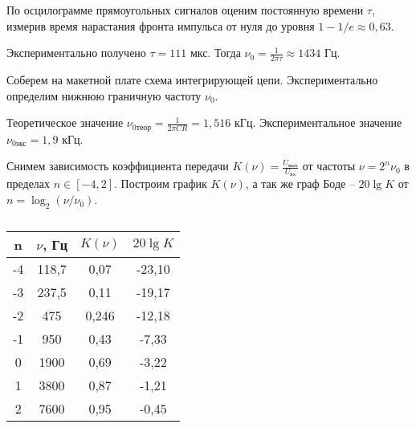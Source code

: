 	
	
	\noindent По осцилограмме прямоугольных сигналов оценим постоянную времени $\tau$,\\ измерив время нарастания фронта импульса от нуля до уровня $1 - 1/e \approx 0,63$.
	
	\noindent Экспериментально получено $\tau = 111$ мкс. Тогда $\nu_0 = \frac{1}{2 \pi \tau} \approx 1434$ Гц.
	
	
	
	\noindent Соберем на макетной плате схема интегрирующей цепи. Экспериментально определим нижнюю граничную частоту $\nu_0$.
	
	\noindent Теоретическое значение $\nu_{\text{0теор}} = \frac{1}{2 \pi C R} = 1,516$ кГц. Экспериментальное значение $\nu_{\text{0экс}} = 1,9$ кГц.
	
	
	\noindent Снимем зависимость коэффициента передачи $K(\nu) = \frac{U_{\text{вых}}}{U_{\text{вх}}}$ от частоты $\nu = 2^n \nu_0$ в пределах $n \in [-4, 2]$. Построим график $K(\nu)$, а так же граф Боде -- $20 \lg K$ от$n = \log_2 (\nu / \nu_0)$.
	
	
	\begin{table}[h!]
		\begin{center}
			\begin{tabular}{|c|c|c|c|}
				\hline
				n  & $\nu$, Гц & $K(\nu)$ & $20 \lg K$  \\ \hline
				-4 & 118,7     & 0,07     & -23,10 \\ \hline
				-3 & 237,5     & 0,11     & -19,17 \\ \hline
				-2 & 475       & 0,246    & -12,18 \\ \hline
				-1 & 950       & 0,43     & -7,33  \\ \hline
				0  & 1900      & 0,69     & -3,22  \\ \hline
				1  & 3800      & 0,87     & -1,21  \\ \hline
				2  & 7600      & 0,95     & -0,45  \\ \hline
			\end{tabular}
		\end{center}
		\caption{}
	\end{table}
	
